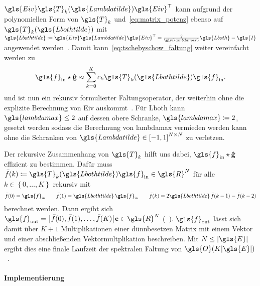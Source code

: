 $\gls{Eiv}\gls{T}_k\left(\gls{Lambdatilde}\right)\gls{Eiv}^{\top}$ kann aufgrund der polynomiellen Form von $\gls{T}_k$ und~\eqref{eq:matrix_potenz} ebenso auf $\gls{T}_k\left(\gls{Lbothtilde}\right)$ mit $\gls{Lbothtilde} \coloneqq \gls{Eiv}\gls{Lambdatilde}\gls{Eiv}^{\top} = \frac{2}{\gls{lambdamax}}\gls{Lboth} - \gls{I}$ angewendet werden~\cite{Defferrard}.
Damit kann~\eqref{eq:tschebyschow_faltung} weiter vereinfacht werden zu
\begin{equation}
  \gls{f}_{\mathrm{in}} \star \ve{\hat g} \approx \sum_{k=0}^K c_k\gls{T}_k\left(\gls{Lbothtilde}\right)\gls{f}_{\mathrm{in}}.
  \label{eq:tschebyschow_faltung_L}
\end{equation}
und ist nun ein rekursiv formulierter Faltungsoperator, der weiterhin ohne die explizite Berechnung von \gls{Eiv} auskommt~\cite{Defferrard}.
Für \gls{Lboth} kann $\gls{lambdamax} \leq 2$ auf dessen obere Schranke, \dhe{} $\gls{lambdamax} \coloneqq 2$, gesetzt werden sodass die Berechnung von \gls{lambdamax} vermieden werden kann ohne die Schranken von $\gls{Lambdatilde} \in {\left[-1, 1\right]}^{N \times N}$ zu verletzen.

Der rekursive Zusammenhang von $\gls{T}_k$ hilft uns dabei, $\gls{f}_{\mathrm{in}} \star \ve{\hat g}$ effizient zu bestimmen.
Dafür muss $\bar f\left(k\right) \coloneqq \gls{T}_k\left(\gls{Lbothtilde}\right)\gls{f}_{\mathrm{in}} \in \gls{R}^N$ für alle $k \in \left\{0, \ldots, K\right\}$ rekursiv mit
\begin{equation*}
\bar f\left(0\right) = \gls{f}_{\mathrm{in}}
\qquad
\bar f\left(1\right) = \gls{Lbothtilde}\,\gls{f}_{\mathrm{in}}
\qquad
\bar f\left(k\right) = 2 \gls{Lbothtilde}\,\bar f\left(k-1\right) - \bar f\left(k - 2\right)
\end{equation*}
berechnet werden.
Dann ergibt sich $\gls{f}_{\mathrm{out}} = \left[\bar f\left(0\right), \bar f\left(1\right), \ldots, \bar f\left(K\right)\right]\ve{c} \in \gls{R}^N$ (\vgl{}~\cite{Hammond}).
$\gls{f}_{\mathrm{out}}$ lässt sich damit über $K + 1$ Multiplikationen einer dünnbesetzen Matrix mit einem Vektor und einer abschließenden Vektormultplikation beschreiben.
Mit $N \leq \left|\gls{E}\right|$ ergibt dies eine finale Laufzeit der spektralen Faltung von $\gls{O}\left(K\left|\gls{E}\right|\right)$~\cite{Defferrard}.

\paragraph{Implementierung}
\label{tschebyschow_tensor}

